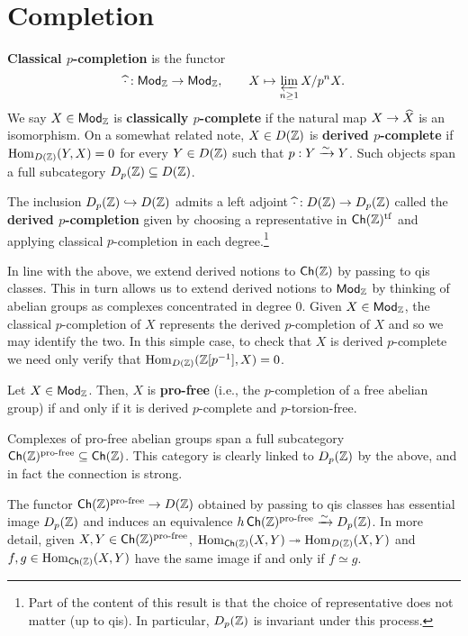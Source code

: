 \documentclass[11pt]{article}
\newcommand{\pf}{\textup{pro-free}} %
\begin{document}
\section{Completion}
\begin{definition}
\textbf{Classical $p$-completion} is the functor
$$\widehat{\cdot}: \operatorname{\mathsf{Mod}}_{\mathbb{Z}}\to\operatorname{\mathsf{Mod}}_{\mathbb{Z}},\qquad X\mapsto\displaystyle\varprojlim_{n\geq1}X/p^nX.$$
We say $X\in\operatorname{\mathsf{Mod}}_{\mathbb{Z}}$ is \textbf{classically $p$-complete} if the natural map $X\to\widehat{X}$ is an isomorphism. On a somewhat related note, $X\in D(\mathbb{Z})$ is \textbf{derived $p$-complete} if $\operatorname{Hom}_{D(\mathbb{Z})}(Y,X)=0$ for every $Y\in D(\mathbb{Z})$ such that $p: Y\xrightarrow{\sim}Y$. Such objects span a full subcategory $D_p(\mathbb{Z})\subseteq D(\mathbb{Z})$.
\end{definition}

\begin{proposition}
The inclusion $D_p(\mathbb{Z})\hookrightarrow D(\mathbb{Z})$ admits a left adjoint $\widehat{\cdot}: D(\mathbb{Z})\to D_p(\mathbb{Z})$ called the \textbf{derived $p$-completion} given by choosing a representative in $\operatorname{\mathsf{Ch}}(\mathbb{Z})^{\operatorname{tf}}$ and applying classical $p$-completion in each degree.\footnote{Part of the content of this result is that the choice of representative does not matter (up to qis). In particular, $D_p(\mathbb{Z})$ is invariant under this process.}
\end{proposition}

In line with the above, we extend derived notions to $\operatorname{\mathsf{Ch}}(\mathbb{Z})$ by passing to qis classes. This in turn allows us to extend derived notions to $\operatorname{\mathsf{Mod}}_{\mathbb{Z}}$ by thinking of abelian groups as complexes concentrated in degree $0$. Given $X\in\operatorname{\mathsf{Mod}}_{\mathbb{Z}}$, the classical $p$-completion of $X$ represents the derived $p$-completion of $X$ and so we may identify the two. In this simple case, to check that $X$ is derived $p$-complete we need only verify that $\operatorname{Hom}_{D(\mathbb{Z})}(\mathbb{Z}[p^{-1}],X)=0$.

\begin{proposition}
Let $X\in\operatorname{\mathsf{Mod}}_{\mathbb{Z}}$. Then, $X$ is \textbf{pro-free} (i.e., the $p$-completion of a free abelian group) if and only if it is derived $p$-complete and $p$-torsion-free.
\end{proposition}

Complexes of pro-free abelian groups span a full subcategory $\Ch(\Z)^{\pf}\subset\Ch(\Z)$. This category is clearly linked to $D_p(\mathbb{Z})$ by the above, and in fact the connection is strong.

\begin{theorem}
The functor $\Ch(\Z)^{\pf}\to D(\Z)$ obtained by passing to qis classes has essential image $D_p(\mathbb{Z})$ and induces an equivalence $h\Ch(\Z)^{\pf}\xto{\sim}D_p(\Z)$. In more detail, given $X,Y\in\Ch(\Z)^{\pf}$, $\operatorname{Hom}_{\operatorname{\mathsf{Ch}}(\mathbb{Z})}(X,Y)\twoheadrightarrow\operatorname{Hom}_{D(\mathbb{Z})}(X,Y)$ and $f,g\in\operatorname{Hom}_{\operatorname{\mathsf{Ch}}(\mathbb{Z})}(X,Y)$ have the same image if and only if $f\simeq g$.
\end{theorem}
\end{document}

